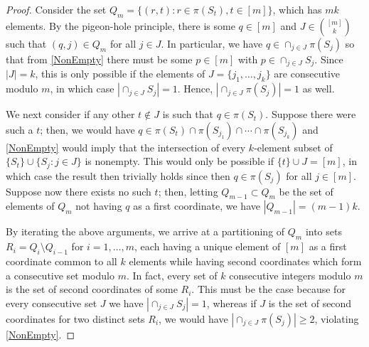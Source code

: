 \documentclass[journal, twocolumn]{IEEEtran}
\begin{document}
\begin{proof} Consider the set $Q_m = \{ (r,t) : r \in \pi(S_t), t \in [m] \}$, which has $mk$ elements. By the pigeon-hole principle, there is some $q \in [m]$ and $J \in {[m] \choose k}$ such that $(q, j) \in Q_m$ for all $j \in J$. In particular, we have $q \in \cap_{j \in J} \pi(S_j)$ so that from \eqref{NonEmpty} there must be some $p \in [m]$ with $p \in \cap_{j \in J} S_j$. Since $|J| = k$, this is only possible if the elements of $J = \{j_1, \ldots, j_k\}$ are consecutive modulo $m$, in which case $|\cap_{j \in J} S_j| = 1$. Hence, $|\cap_{j \in J} \pi(S_j)| = 1$ as well.

We next consider if any other $t \notin J$ is such that $q \in \pi(S_t)$. Suppose there were such a $t$; then, we would have $q \in \pi(S_t) \cap \pi(S_{j_1}) \cap \cdots \cap \pi(S_{j_k})$ and \eqref{NonEmpty} would imply that the intersection of every $k$-element subset of $\{S_t\} \cup \{S_j: j \in J\}$ is nonempty. This would only be possible if $\{t\} \cup J = [m]$, in which case the result then trivially holds since then $q \in \pi(S_j)$ for all $j \in [m]$.  Suppose now there exists no such $t$; then, letting $Q_{m-1} \subset Q_m$ be the set of elements of $Q_m$ not having $q$ as a first coordinate, we have $|Q_{m-1}| = (m-1)k$. 

By iterating the above arguments, we arrive at a partitioning of $Q_m$ into sets $R_i = Q_i \setminus Q_{i-1}$ for $i = 1, \ldots, m$, each having a unique element of $[m]$ as a first coordinate common to all $k$ elements while having second coordinates which form a consecutive set modulo $m$. In fact, every set of $k$ consecutive integers modulo $m$ is the set of second coordinates of some $R_i$. This must be the case because for every consecutive set $J$ we have $|\cap_{j \in J} S_j| = 1$, whereas if $J$ is the set of second coordinates for two distinct sets $R_i$, we would have \mbox{$|\cap_{j \in J} \pi(S_j)| \geq 2$}, violating \eqref{NonEmpty}. 
\end{proof}
\end{document}
